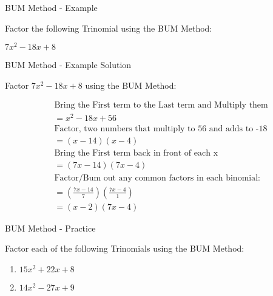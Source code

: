 \documentclass[aspectratio=169]{beamer}
\begin{document}
\begin{frame}{BUM Method - Example}
    \begin{tcolorbox}[colback=lightgray,colframe=primary,title=Example: Factor using BUM Method]
        \footnotesize
        Factor the following Trinomial using the BUM Method:
        
        $7x^2 - 18x + 8$
    \end{tcolorbox}
\end{frame}

\begin{frame}{BUM Method - Example Solution}
    \begin{tcolorbox}[colback=lightgray,colframe=accent,title=Detailed Solution]
        \footnotesize
        Factor $7x^2 - 18x + 8$ using the BUM Method:
        
        \begin{align*}
            & \text{Bring the First term to the Last term and Multiply them} \\
            &= x^2 - 18x + 56 \\
            & \text{Factor, two numbers that multiply to 56 and adds to -18} \\
            &= (x - 14)(x - 4) \\
            & \text{Bring the First term back in front of each x} \\
            &= (7x - 14)(7x - 4) \\
            & \text{Factor/Bum out any common factors in each binomial:} \\
            &= \left(\frac{7x - 14}{7}\right)\left(\frac{7x - 4}{1}\right) \\
            &= (x - 2)(7x - 4)
        \end{align*}
    \end{tcolorbox}
\end{frame}

\begin{frame}{BUM Method - Practice}
    \begin{tcolorbox}[colback=lightgray,colframe=primary,title=Practice: Factor using BUM Method]
        \footnotesize
        Factor each of the following Trinomials using the BUM Method:
        \begin{enumerate}
            \setlength{\itemsep}{0.5em}
            \item $15x^2 + 22x + 8$
            \item $14x^2 - 27x + 9$
        \end{enumerate}
    \end{tcolorbox}
\end{frame}
\end{document}
